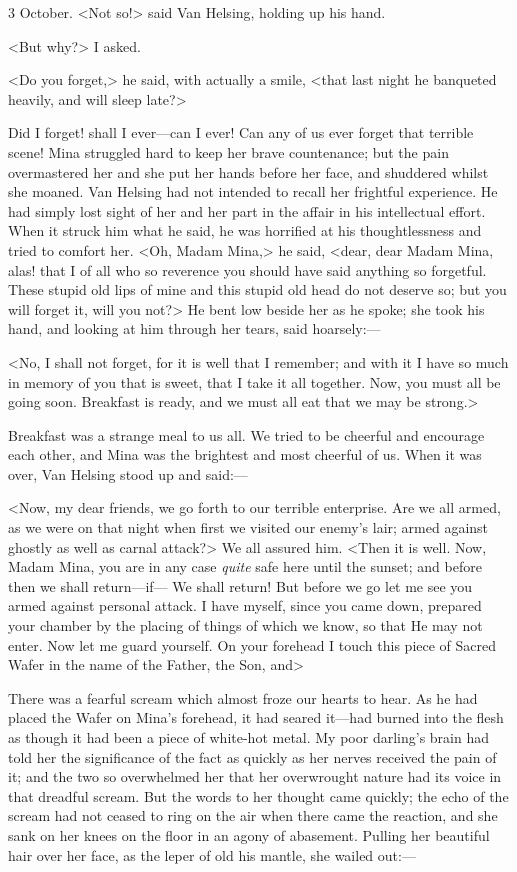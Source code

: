 \begin{diary}{3 October.}
<Not so!> said Van Helsing, holding up his hand.

<But why?> I asked.

<Do you forget,> he said, with actually a smile, <that last night he banqueted heavily, and will sleep late?>

Did I forget! shall I ever—can I ever! Can any of us ever forget that terrible scene! Mina struggled hard to keep her brave countenance; but the pain overmastered her and she put her hands before her face, and shuddered whilst she moaned. Van Helsing had not intended to recall her frightful experience. He had simply lost sight of her and her part in the affair in his intellectual effort. When it struck him what he said, he was horrified at his thoughtlessness and tried to comfort her. <Oh, Madam Mina,> he said, <dear, dear Madam Mina, alas! that I of all who so reverence you should have said anything so forgetful. These stupid old lips of mine and this stupid old head do not deserve so; but you will forget it, will you not?> He bent low beside her as he spoke; she took his hand, and looking at him through her tears, said hoarsely:—

<No, I shall not forget, for it is well that I remember; and with it I have so much in memory of you that is sweet, that I take it all together. Now, you must all be going soon. Breakfast is ready, and we must all eat that we may be strong.>

Breakfast was a strange meal to us all. We tried to be cheerful and encourage each other, and Mina was the brightest and most cheerful of us. When it was over, Van Helsing stood up and said:—

<Now, my dear friends, we go forth to our terrible enterprise. Are we all armed, as we were on that night when first we visited our enemy's lair; armed against ghostly as well as carnal attack?> We all assured him. <Then it is well. Now, Madam Mina, you are in any case \textit{quite} safe here until the sunset; and before then we shall return—if— We shall return! But before we go let me see you armed against personal attack. I have myself, since you came down, prepared your chamber by the placing of things of which we know, so that He may not enter. Now let me guard yourself. On your forehead I touch this piece of Sacred Wafer in the name of the Father, the Son, and\longdash>

There was a fearful scream which almost froze our hearts to hear. As he had placed the Wafer on Mina's forehead, it had seared it—had burned into the flesh as though it had been a piece of white-hot metal. My poor darling's brain had told her the significance of the fact as quickly as her nerves received the pain of it; and the two so overwhelmed her that her overwrought nature had its voice in that dreadful scream. But the words to her thought came quickly; the echo of the scream had not ceased to ring on the air when there came the reaction, and she sank on her knees on the floor in an agony of abasement. Pulling her beautiful hair over her face, as the leper of old his mantle, she wailed out:—


\end{diary}
